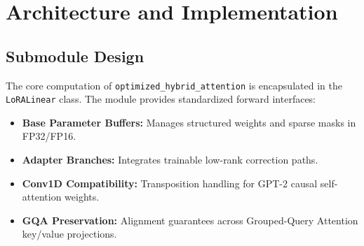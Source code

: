 \section{Architecture and Implementation}

\subsection{Submodule Design}
The core computation of \texttt{optimized_hybrid_attention} is encapsulated in the \texttt{LoRALinear} class. The module provides standardized forward interfaces:
\begin{itemize}
\item \textbf{Base Parameter Buffers:} Manages structured weights and sparse masks in FP32/FP16.
\item \textbf{Adapter Branches:} Integrates trainable low-rank correction paths.
\item \textbf{Conv1D Compatibility:} Transposition handling for GPT-2 causal self-attention weights.
\item \textbf{GQA Preservation:} Alignment guarantees across Grouped-Query Attention key/value projections.
\end{itemize}
